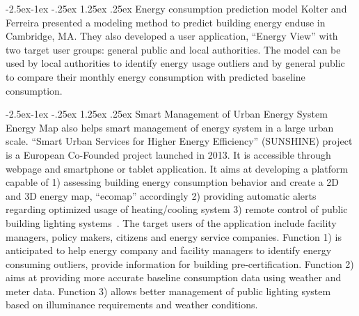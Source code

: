 \documentclass[hidelinks,12pt]{article}
\makeatletter
\renewcommand\paragraph{\@startsection{paragraph}{4}{\z@}%
            {-2.5ex\@plus -1ex \@minus -.25ex}%
            {1.25ex \@plus .25ex}%
            {\normalfont\normalsize\bfseries}}
\makeatother
\begin{document}
\paragraph{Energy consumption prediction model}
Kolter and Ferreira presented a modeling method to predict building
energy enduse in Cambridge, MA. They also developed a user
application, ``Energy View'' with two target user groups: general
public and local authorities. The model can be used by local
authorities to identify energy usage outliers and by general public to
compare their monthly energy consumption with predicted baseline
consumption.

\paragraph{Smart Management of Urban Energy System}
Energy Map also helps smart management of energy system in a large
urban scale. ``Smart Urban Services for Higher Energy Efficiency''
(SUNSHINE) project is a European Co-Founded project launched in
2013. It is accessible through webpage and smartphone or tablet
application. It aims at developing a platform capable of 1) assessing
building energy consumption behavior and create a 2D and 3D energy
map, ``ecomap'' accordingly 2) providing automatic alerts regarding
optimized usage of heating/cooling system 3) remote control of public
building lighting systems~\cite{SUNSHINE2015}. The target users of the
application include facility managers, policy makers, citizens and
energy service companies. Function 1) is anticipated to help energy
company and facility managers to identify energy consuming outliers,
provide information for building pre-certification. Function 2) aims
at providing more accurate baseline consumption data using weather and
meter data. Function 3) allows better management of public lighting
system based on illuminance requirements and weather conditions.
\end{document}
